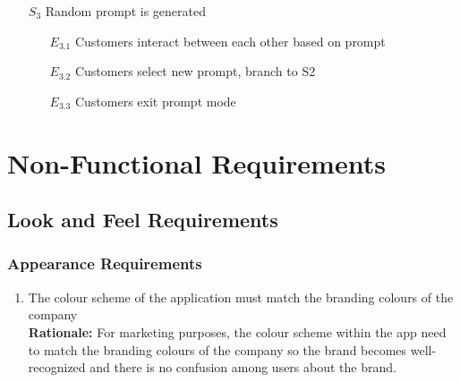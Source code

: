 \documentclass[]{article}
\begin{document}
\begin{enumerate}[{\textbf{BE}}1.]
\begin{enumerate}[{VP6}.1]
\begin{enumerate}
                \item[$S_3$] Random prompt is generated
                \begin{enumerate}
                    \item[$E_{3.1}$] Customers interact between each other based on prompt
                    \item[$E_{3.2}$] Customers select new prompt, branch to S2
                    \item[$E_{3.3}$] Customers exit prompt mode
                \end{enumerate}
            \end{enumerate}
    \end{enumerate}
\end{enumerate}

\section{Non-Functional Requirements}
\label{sec:non-functional_requirements}

\subsection{Look and Feel Requirements}
\label{sub:look_and_feel_requirements}

\subsubsection{Appearance Requirements}
\label{ssub:appearance_requirements}
\begin{enumerate}[{LF-A}1. ]
	\item The colour scheme of the application must match the branding colours of the company \\
	{\bf Rationale:} For marketing purposes, the colour scheme within the app need to match the branding colours of the company so the brand becomes well-recognized and there is no confusion among users about the brand.
\end{enumerate}
\end{document}
